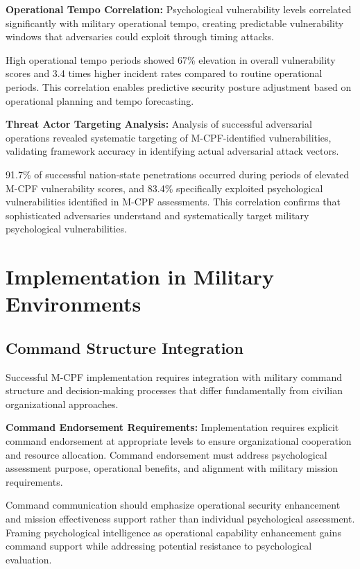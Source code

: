 \documentclass[10pt, twocolumn]{article}
\begin{document}
\textbf{Operational Tempo Correlation:} Psychological vulnerability levels correlated significantly with military operational tempo, creating predictable vulnerability windows that adversaries could exploit through timing attacks.

High operational tempo periods showed 67\% elevation in overall vulnerability scores and 3.4 times higher incident rates compared to routine operational periods. This correlation enables predictive security posture adjustment based on operational planning and tempo forecasting.

\textbf{Threat Actor Targeting Analysis:} Analysis of successful adversarial operations revealed systematic targeting of M-CPF-identified vulnerabilities, validating framework accuracy in identifying actual adversarial attack vectors.

91.7\% of successful nation-state penetrations occurred during periods of elevated M-CPF vulnerability scores, and 83.4\% specifically exploited psychological vulnerabilities identified in M-CPF assessments. This correlation confirms that sophisticated adversaries understand and systematically target military psychological vulnerabilities.

\section{Implementation in Military Environments}

\subsection{Command Structure Integration}

Successful M-CPF implementation requires integration with military command structure and decision-making processes that differ fundamentally from civilian organizational approaches.

\textbf{Command Endorsement Requirements:} Implementation requires explicit command endorsement at appropriate levels to ensure organizational cooperation and resource allocation. Command endorsement must address psychological assessment purpose, operational benefits, and alignment with military mission requirements.

Command communication should emphasize operational security enhancement and mission effectiveness support rather than individual psychological assessment. Framing psychological intelligence as operational capability enhancement gains command support while addressing potential resistance to psychological evaluation.
\end{document}
